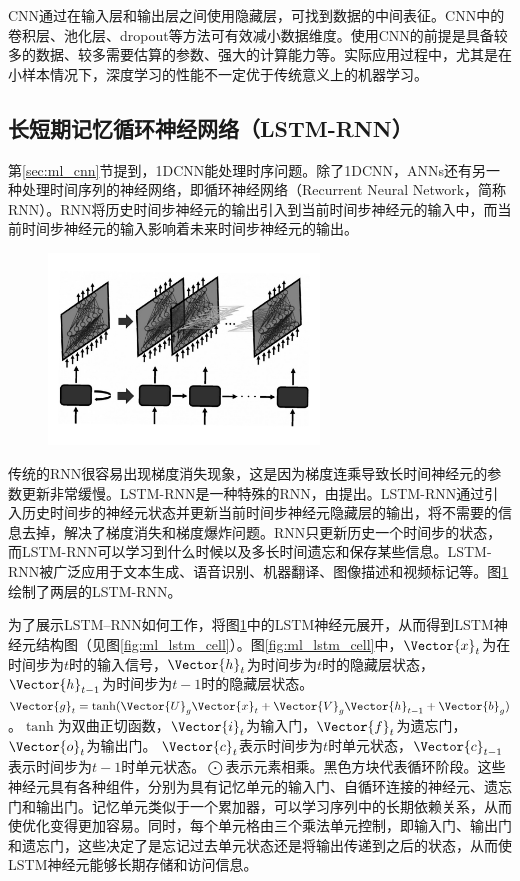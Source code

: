 CNN通过在输入层和输出层之间使用隐藏层，可找到数据的中间表征。CNN中的卷积层、池化层、dropout等方法可有效减小数据维度。使用CNN的前提是具备较多的数据、较多需要估算的参数、强大的计算能力等。实际应用过程中，尤其是在小样本情况下，深度学习的性能不一定优于传统意义上的机器学习。

\subsection{长短期记忆循环神经网络（LSTM-RNN）}\label{sec:ml_lstm}

第\ref{sec:ml_cnn}节提到，1DCNN能处理时序问题。除了1DCNN，ANNs还有另一种处理时间序列的神经网络，即循环神经网络（Recurrent Neural Network，简称RNN）。RNN将历史时间步神经元的输出引入到当前时间步神经元的输入中，而当前时间步神经元的输入影响着未来时间步神经元的输出。

\begin{figure}[!htbp]
  \centering
  \noindent\includegraphics[width=72mm]{Img/chap2_ml/lstm_rnn}
  \label{fig:ml_lstm_rnn}
\end{figure}

传统的RNN很容易出现梯度消失现象，这是因为梯度连乘导致长时间神经元的参数更新非常缓慢。LSTM-RNN是一种特殊的RNN，由\citet{hochreiter1997long}提出。LSTM-RNN通过引入历史时间步的神经元状态并更新当前时间步神经元隐藏层的输出，将不需要的信息去掉，解决了梯度消失和梯度爆炸问题。RNN只更新历史一个时间步的状态，而LSTM-RNN可以学习到什么时候以及多长时间遗忘和保存某些信息。LSTM-RNN被广泛应用于文本生成、语音识别、机器翻译、图像描述和视频标记等。图\ref{fig:ml_lstm_rnn}绘制了两层的LSTM-RNN。

为了展示LSTM–RNN如何工作，将图\ref{fig:ml_lstm_rnn}中的LSTM神经元展开，从而得到LSTM神经元结构图（见图\ref{fig:ml_lstm_cell}）。图\ref{fig:ml_lstm_cell}中，$\Vector{x}_t$为在时间步为$t$时的输入信号，$\Vector{h}_{t}$为时间步为$t$时的隐藏层状态，$\Vector{h}_{t-1}$为时间步为$t-1$时的隐藏层状态。$\Vector{g}_t=\tanh(\Vector{U}_g\Vector{x}_t+\Vector{V}_g\Vector{h}_{t-1}+\Vector{b}_g)$。$\tanh$为双曲正切函数，$\Vector{i}_t$为输入门，$\Vector{f}_t$为遗忘门，$\Vector{o}_t$为输出门。 $\Vector{c}_t$表示时间步为$t$时单元状态，$\Vector{c}_{t-1}$ 表示时间步为$t-1$时单元状态。$\bigodot$表示元素相乘。黑色方块代表循环阶段。这些神经元具有各种组件，分别为具有记忆单元的输入门、自循环连接的神经元、遗忘门和输出门。记忆单元类似于一个累加器，可以学习序列中的长期依赖关系，从而使优化变得更加容易。同时，每个单元格由三个乘法单元控制，即输入门、输出门和遗忘门，这些决定了是忘记过去单元状态还是将输出传递到之后的状态，从而使LSTM神经元能够长期存储和访问信息。

